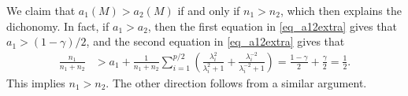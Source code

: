 \begin{example}
We claim that $a_1(M) > a_2 (M)$ if and only if $n_1 > n_2$, which then explains the dichonomy. In fact, if $a_1>a_2$, then the first equation in \eqref{eq_a12extra} gives that $a_1> (1-\gamma)/2$, and the second equation in  \eqref{eq_a12extra} gives that
\begin{align*}
 \frac{n_1}{n_1 + n_2} &> a_1 + \frac{1}{n_1+n_2} \sum_{i=1}^{p/2}\left(\frac{\lambda_i^2}{\lambda_i^2+1}+\frac{\lambda_i^{-2}}{\lambda_i^{-2}+1}\right) = \frac{1-\gamma}{2}+\frac{\gamma}{2}=\frac{1}{2}.
\end{align*}
This implies $n_1>n_2$. The other direction follows from a similar argument. %
\end{example}

